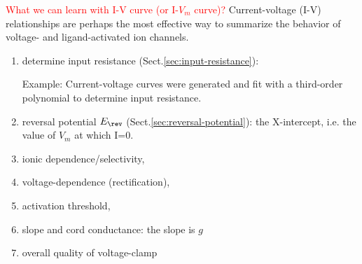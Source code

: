 \textcolor{red}{What we can learn with I-V curve (or I-$V_m$ curve)?}
Current-voltage (I-V) relationships are perhaps the most effective
way to summarize the behavior of voltage- and ligand-activated
ion channels.
\begin{enumerate}

  \item determine input resistance (Sect.\ref{sec:input-resistance}):

Example: Current-voltage curves were generated and fit with a
third-order polynomial to determine input resistance.

  \item reversal potential $E_\rev$ (Sect.\ref{sec:reversal-potential}): the
  X-intercept, i.e.
  the value of $V_m$ at which I=0.

  \item ionic dependence/selectivity,

  \item voltage-dependence (rectification),
  \item activation threshold,
  \item slope and cord conductance:  the slope is $g$

  \item overall quality of voltage-clamp
\end{enumerate}


